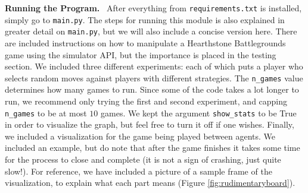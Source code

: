 \documentclass{paper}
\newcommand{\inlineSection}[1]{\vspace{0.5em}\noindent\textbf{#1.}~}
\begin{document}
\inlineSection{Running the Program} After everything from  \texttt{requirements.txt} is installed, simply go to \texttt{main.py}. The steps for running this module is also explained in greater detail on \texttt{main.py}, but we will also include a concise version here. There are included instructions on how to manipulate a Hearthstone Battlegrounds game using the simulator API, but the importance is placed in the testing section. We included three different experiments: each of which puts a player who selects random moves against players with different strategies. The \texttt{n\_games} value determines how many games to run. Since some of the code takes a lot longer to run, we recommend only trying the first and second experiment, and capping \texttt{n\_games} to be at most $10$ games. We kept the argument \texttt{show\_stats} to be True in order to visualize the graph, but feel free to turn it off if one wishes. Finally, we included  a visualization for the game being played between agents. We included an example, but do note that after the game finishes it takes some time for the process to close and complete (it is not a sign of crashing, just quite slow!).  For reference, we have included a picture of a sample frame of the visualization, to explain what each part means (Figure \ref{fig:rudimentaryboard}). 
\end{document}
